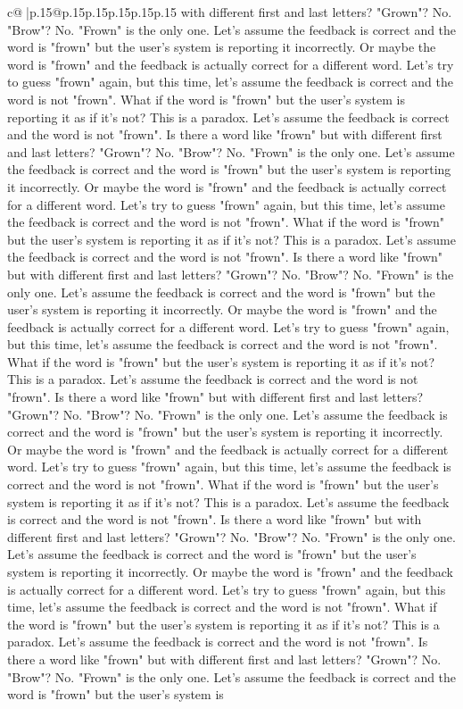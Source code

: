 \documentclass{article}
\begin{document}
{\begin{supertabular}{c@{$\;$}|p{.15\linewidth}@{}p{.15\linewidth}p{.15\linewidth}p{.15\linewidth}p{.15\linewidth}p{.15\linewidth}}
{{{with different first and last letters? "Grown"? No. "Brow"? No. "Frown" is the only one. Let's assume the feedback is correct and the word is "frown" but the user's system is reporting it incorrectly. Or maybe the word is "frown" and the feedback is actually correct for a different word. Let's try to guess "frown" again, but this time, let's assume the feedback is correct and the word is not "frown". What if the word is "frown" but the user's system is reporting it as if it's not? This is a paradox. Let's assume the feedback is correct and the word is not "frown". Is there a word like "frown" but with different first and last letters? "Grown"? No. "Brow"? No. "Frown" is the only one. Let's assume the feedback is correct and the word is "frown" but the user's system is reporting it incorrectly. Or maybe the word is "frown" and the feedback is actually correct for a different word. Let's try to guess "frown" again, but this time, let's assume the feedback is correct and the word is not "frown". What if the word is "frown" but the user's system is reporting it as if it's not? This is a paradox. Let's assume the feedback is correct and the word is not "frown". Is there a word like "frown" but with different first and last letters? "Grown"? No. "Brow"? No. "Frown" is the only one. Let's assume the feedback is correct and the word is "frown" but the user's system is reporting it incorrectly. Or maybe the word is "frown" and the feedback is actually correct for a different word. Let's try to guess "frown" again, but this time, let's assume the feedback is correct and the word is not "frown". What if the word is "frown" but the user's system is reporting it as if it's not? This is a paradox. Let's assume the feedback is correct and the word is not "frown". Is there a word like "frown" but with different first and last letters? "Grown"? No. "Brow"? No. "Frown" is the only one. Let's assume the feedback is correct and the word is "frown" but the user's system is reporting it incorrectly. Or maybe the word is "frown" and the feedback is actually correct for a different word. Let's try to guess "frown" again, but this time, let's assume the feedback is correct and the word is not "frown". What if the word is "frown" but the user's system is reporting it as if it's not? This is a paradox. Let's assume the feedback is correct and the word is not "frown". Is there a word like "frown" but with different first and last letters? "Grown"? No. "Brow"? No. "Frown" is the only one. Let's assume the feedback is correct and the word is "frown" but the user's system is reporting it incorrectly. Or maybe the word is "frown" and the feedback is actually correct for a different word. Let's try to guess "frown" again, but this time, let's assume the feedback is correct and the word is not "frown". What if the word is "frown" but the user's system is reporting it as if it's not? This is a paradox. Let's assume the feedback is correct and the word is not "frown". Is there a word like "frown" but with different first and last letters? "Grown"? No. "Brow"? No. "Frown" is the only one. Let's assume the feedback is correct and the word is "frown" but the user's system is }}}
\end{supertabular}}
\end{document}
